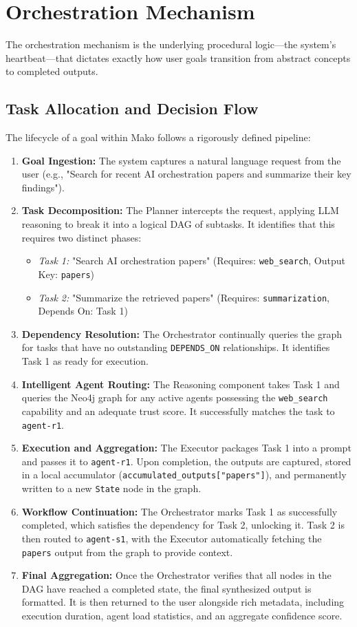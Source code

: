 \section{Orchestration Mechanism}
The orchestration mechanism is the underlying procedural logic—the system's heartbeat—that dictates exactly how user goals transition from abstract concepts to completed outputs.

\subsection{Task Allocation and Decision Flow}
The lifecycle of a goal within Mako follows a rigorously defined pipeline:

\begin{enumerate}
    \item \textbf{Goal Ingestion:} The system captures a natural language request from the user (e.g., "Search for recent AI orchestration papers and summarize their key findings").
    \item \textbf{Task Decomposition:} The Planner intercepts the request, applying LLM reasoning to break it into a logical DAG of subtasks. It identifies that this requires two distinct phases:
    \begin{itemize}
        \item \textit{Task 1:} "Search AI orchestration papers" (Requires: \texttt{web\_search}, Output Key: \texttt{papers})
        \item \textit{Task 2:} "Summarize the retrieved papers" (Requires: \texttt{summarization}, Depends On: Task 1)
    \end{itemize}
    \item \textbf{Dependency Resolution:} The Orchestrator continually queries the graph for tasks that have no outstanding \texttt{DEPENDS\_ON} relationships. It identifies Task 1 as ready for execution.
    \item \textbf{Intelligent Agent Routing:} The Reasoning component takes Task 1 and queries the Neo4j graph for any active agents possessing the \texttt{web\_search} capability and an adequate trust score. It successfully matches the task to \texttt{agent-r1}.
    \item \textbf{Execution and Aggregation:} The Executor packages Task 1 into a prompt and passes it to \texttt{agent-r1}. Upon completion, the outputs are captured, stored in a local accumulator (\texttt{accumulated\_outputs["papers"]}), and permanently written to a new \texttt{State} node in the graph.
    \item \textbf{Workflow Continuation:} The Orchestrator marks Task 1 as successfully completed, which satisfies the dependency for Task 2, unlocking it. Task 2 is then routed to \texttt{agent-s1}, with the Executor automatically fetching the \texttt{papers} output from the graph to provide context.
    \item \textbf{Final Aggregation:} Once the Orchestrator verifies that all nodes in the DAG have reached a completed state, the final synthesized output is formatted. It is then returned to the user alongside rich metadata, including execution duration, agent load statistics, and an aggregate confidence score.
\end{enumerate}

